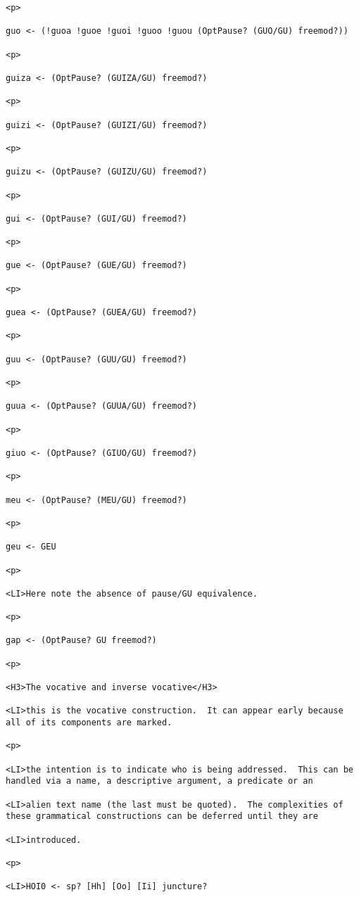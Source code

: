 \documentclass[12pt]{article}
\begin{document}
\begin{lstlisting}
<p>

guo <- (!guoa !guoe !guoi !guoo !guou (OptPause? (GUO/GU) freemod?))

<p>

guiza <- (OptPause? (GUIZA/GU) freemod?)

<p>

guizi <- (OptPause? (GUIZI/GU) freemod?)

<p>

guizu <- (OptPause? (GUIZU/GU) freemod?)

<p>

gui <- (OptPause? (GUI/GU) freemod?)

<p>

gue <- (OptPause? (GUE/GU) freemod?)

<p>

guea <- (OptPause? (GUEA/GU) freemod?)

<p>

guu <- (OptPause? (GUU/GU) freemod?)

<p>

guua <- (OptPause? (GUUA/GU) freemod?)

<p>

giuo <- (OptPause? (GIUO/GU) freemod?)

<p>

meu <- (OptPause? (MEU/GU) freemod?)

<p>

geu <- GEU

<p>

<LI>Here note the absence of pause/GU equivalence.

<p>

gap <- (OptPause? GU freemod?)

<p>

<H3>The vocative and inverse vocative</H3>

<LI>this is the vocative construction.  It can appear early because all of its components are marked.

<p>

<LI>the intention is to indicate who is being addressed.  This can be handled via a name, a descriptive argument, a predicate or an

<LI>alien text name (the last must be quoted).  The complexities of these grammatical constructions can be deferred until they are

<LI>introduced.

<p>

<LI>HOI0 <- sp? [Hh] [Oo] [Ii] juncture?


\end{lstlisting}
\end{document}
